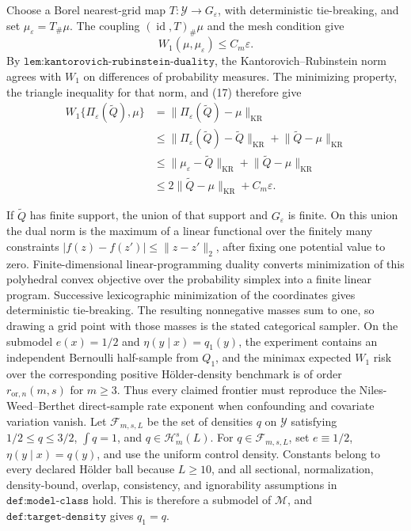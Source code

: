 Choose a Borel nearest-grid map \(T:\mathcal Y\to G_\varepsilon\), with deterministic tie-breaking, and set \(\mu_\varepsilon=T_\#\mu\).  The coupling \((\operatorname{id},T)_\#\mu\) and the mesh condition give
\[
 W_1(\mu,\mu_\varepsilon)\leq C_m\varepsilon.
 \tag{17}
\]
By \(\texttt{lem:kantorovich-rubinstein-duality}\), the Kantorovich--Rubinstein norm agrees with \(W_1\) on differences of probability measures.  The minimizing property, the triangle inequality for that norm, and (17) therefore give
\[
\begin{aligned}
 W_1\{\Pi_\varepsilon(\widetilde Q),\mu\}
 &=\lVert\Pi_\varepsilon(\widetilde Q)-\mu\rVert_{\mathrm{KR}}\\
 &\leq\lVert\Pi_\varepsilon(\widetilde Q)-\widetilde Q\rVert_{\mathrm{KR}}
       +\lVert\widetilde Q-\mu\rVert_{\mathrm{KR}}\\
 &\leq\lVert\mu_\varepsilon-\widetilde Q\rVert_{\mathrm{KR}}
       +\lVert\widetilde Q-\mu\rVert_{\mathrm{KR}}\\
 &\leq2\lVert\widetilde Q-\mu\rVert_{\mathrm{KR}}+C_m\varepsilon.
\end{aligned}
\]

If \(\widetilde Q\) has finite support, the union of that support and \(G_\varepsilon\) is finite.  On this union the dual norm is the maximum of a linear functional over the finitely many constraints \(|f(z)-f(z')|\leq\lVert z-z'\rVert_2\), after fixing one potential value to zero.  Finite-dimensional linear-programming duality converts minimization of this polyhedral convex objective over the probability simplex into a finite linear program.  Successive lexicographic minimization of the coordinates gives deterministic tie-breaking.  The resulting nonnegative masses sum to one, so drawing a grid point with those masses is the stated categorical sampler.
On the submodel \(e(x)=1/2\) and \(\eta(y\mid x)=q_1(y)\), the experiment contains an independent Bernoulli half-sample from \(Q_1\), and the minimax expected \(W_1\) risk over the corresponding positive Hölder-density benchmark is of order \(r_{\mathrm{or},n}(m,s)\) for \(m\ge3\). Thus every claimed frontier must reproduce the Niles-Weed--Berthet direct-sample rate exponent when confounding and covariate variation vanish.
Let \(\mathcal F_{m,s,L}\) be the set of densities \(q\) on \(\mathcal Y\) satisfying \(1/2\leq q\leq3/2\), \(\int q=1\), and \(q\in\mathcal H_m^s(L)\).  For \(q\in\mathcal F_{m,s,L}\), set \(e\equiv1/2\), \(\eta(y\mid x)=q(y)\), and use the uniform control density.  Constants belong to every declared Hölder ball because \(L\geq10\), and all sectional, normalization, density-bound, overlap, consistency, and ignorability assumptions in \(\texttt{def:model-class}\) hold.  This is therefore a submodel of \(\mathcal M\), and \(\texttt{def:target-density}\) gives \(q_1=q\).

